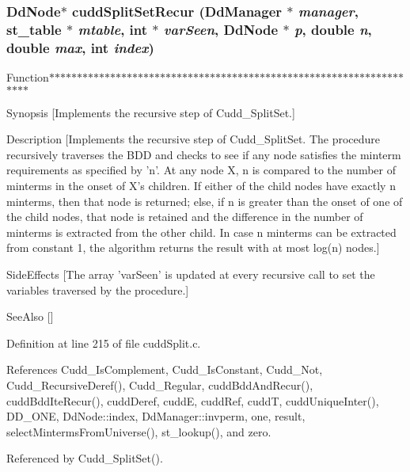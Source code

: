 \subsubsection{\setlength{\rightskip}{0pt plus 5cm}\bf{Dd\-Node}$\ast$ cudd\-Split\-Set\-Recur (\bf{Dd\-Manager} $\ast$ {\em manager}, \bf{st\_\-table} $\ast$ {\em mtable}, int $\ast$ {\em var\-Seen}, \bf{Dd\-Node} $\ast$ {\em p}, double {\em n}, double {\em max}, int {\em index})}\label{cuddSplit_8c_f9e9a7811e6b27fd27f3ddda57dffb5a}


Function$\ast$$\ast$$\ast$$\ast$$\ast$$\ast$$\ast$$\ast$$\ast$$\ast$$\ast$$\ast$$\ast$$\ast$$\ast$$\ast$$\ast$$\ast$$\ast$$\ast$$\ast$$\ast$$\ast$$\ast$$\ast$$\ast$$\ast$$\ast$$\ast$$\ast$$\ast$$\ast$$\ast$$\ast$$\ast$$\ast$$\ast$$\ast$$\ast$$\ast$$\ast$$\ast$$\ast$$\ast$$\ast$$\ast$$\ast$$\ast$$\ast$$\ast$$\ast$$\ast$$\ast$$\ast$$\ast$$\ast$$\ast$$\ast$$\ast$$\ast$$\ast$$\ast$$\ast$$\ast$$\ast$$\ast$$\ast$$\ast$

Synopsis [Implements the recursive step of Cudd\_\-Split\-Set.]

Description [Implements the recursive step of Cudd\_\-Split\-Set. The procedure recursively traverses the BDD and checks to see if any node satisfies the minterm requirements as specified by 'n'. At any node X, n is compared to the number of minterms in the onset of X's children. If either of the child nodes have exactly n minterms, then that node is returned; else, if n is greater than the onset of one of the child nodes, that node is retained and the difference in the number of minterms is extracted from the other child. In case n minterms can be extracted from constant 1, the algorithm returns the result with at most log(n) nodes.]

Side\-Effects [The array 'var\-Seen' is updated at every recursive call to set the variables traversed by the procedure.]

See\-Also [] 

Definition at line 215 of file cudd\-Split.c.

References Cudd\_\-Is\-Complement, Cudd\_\-Is\-Constant, Cudd\_\-Not, Cudd\_\-Recursive\-Deref(), Cudd\_\-Regular, cudd\-Bdd\-And\-Recur(), cudd\-Bdd\-Ite\-Recur(), cudd\-Deref, cudd\-E, cudd\-Ref, cudd\-T, cudd\-Unique\-Inter(), DD\_\-ONE, Dd\-Node::index, Dd\-Manager::invperm, one, result, select\-Minterms\-From\-Universe(), st\_\-lookup(), and zero.

Referenced by Cudd\_\-Split\-Set().
